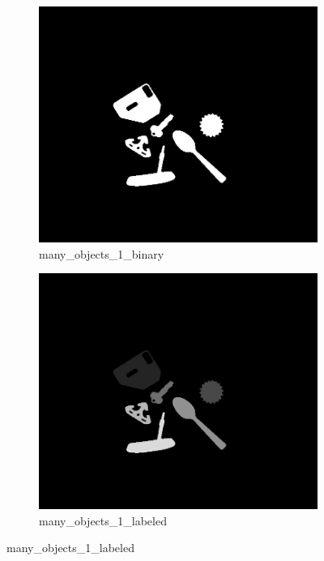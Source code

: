 \documentclass[bwprint]{gmcmthesis}
\numberwithin{figure}{section}
\begin{document}
\begin{enumerate}[label=\alph*.]
\begin{figure}[h]
\begin{subfigure}[b]{0.3\textwidth}
            \includegraphics[width=\textwidth]{../output/many_objects_1_binary.png}
            \caption{many\_objects\_1\_binary}
            \label{fig:subfigure2}
        \end{subfigure}
        \hfill
        \begin{subfigure}[b]{0.3\textwidth}
            \centering
            \includegraphics[width=\textwidth]{../output/many_objects_1_labeled.png}
            \caption{many\_objects\_1\_labeled}
            \label{fig:subfigure3}
        \end{subfigure}
        \newline


\end{figure}
\end{enumerate}
\end{document}
